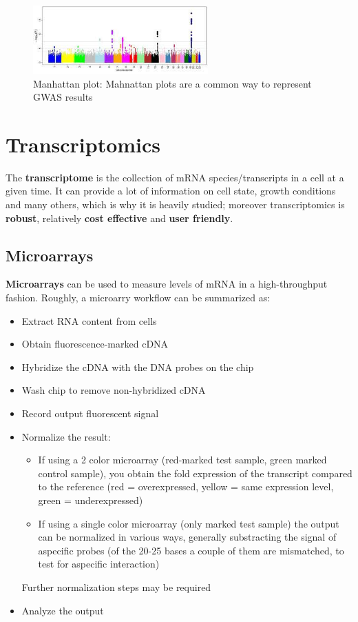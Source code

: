       \begin{figure}[h]
      \caption{Manhattan plot: Mahnattan plots are a common way to represent GWAS results}
      \centering
      \includegraphics[width=0.6\textwidth]{ManhattanPlot.jpg}
      \end{figure}


  \section{Transcriptomics}
    The \textbf{transcriptome} is the collection of mRNA species/transcripts in a cell at a given time. It can provide a lot of information on cell state, growth conditions and many others, which is why it is heavily studied; moreover transcriptomics is \textbf{robust}, relatively \textbf{cost effective} and \textbf{user friendly}.
    
    \subsection{Microarrays}
      \textbf{Microarrays} can be used to measure levels of mRNA in a high-throughput fashion.
      Roughly, a microarry workflow can be summarized as:
      \begin{itemize}
        \item Extract RNA content from cells
        \item Obtain fluorescence-marked cDNA
        \item Hybridize the cDNA with the DNA probes on the chip 
        \item Wash chip to remove non-hybridized cDNA
        \item Record output fluorescent signal
        \item Normalize the result:
        \begin{itemize}
          \item If using a 2 color microarray (red-marked test sample, green marked control sample), you obtain the fold expression of the transcript compared to the reference (red = overexpressed, yellow = same expression level, green = underexpressed)
          \item If using a single color microarray (only marked test sample) the output can be normalized in various ways, generally substracting the signal of aspecific probes (of the 20-25 bases a couple of them are mismatched, to test for aspecific interaction)
        \end{itemize}
        Further normalization steps may be required
        \item Analyze the output
      \end{itemize}

